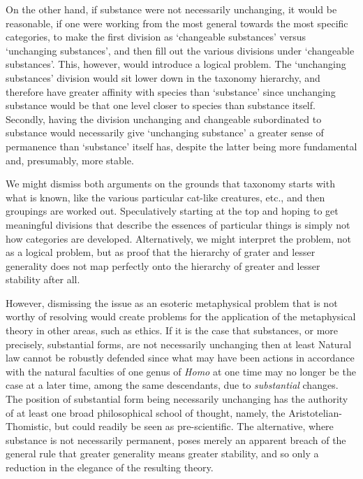 On the other hand, if substance were not necessarily unchanging, it would be reasonable, if one were working from the most general towards the most specific categories, to make the first division as `changeable substances' versus `unchanging substances', and then fill out the various divisions under `changeable substances'. This, however, would introduce a logical problem. The `unchanging substances' division would sit lower down in the taxonomy hierarchy, and therefore have greater affinity with species than `substance' since unchanging substance would be that one level closer to species than substance itself. Secondly, having the division unchanging and changeable subordinated to substance would necessarily give `unchanging substance' a greater sense of permanence than `substance' itself has, despite the latter being more fundamental and, presumably, more stable.

We might dismiss both arguments on the grounds that taxonomy starts with what is known, like the various particular cat-like creatures, etc., and then groupings are worked out. Speculatively starting at the top and hoping to get meaningful divisions that describe the essences of particular things is simply not how categories are developed. Alternatively, we might interpret the problem, not as a logical problem, but as proof that the hierarchy of grater and lesser generality does not map perfectly onto the hierarchy of greater and lesser stability after all.

However, dismissing the issue as an esoteric metaphysical problem that is not worthy of resolving would create problems for the application of the metaphysical theory in other areas, such as ethics. If it is the case that substances, or more precisely, substantial forms, are not necessarily unchanging then at least Natural law cannot be robustly defended since what may have been actions in accordance with the natural faculties of one genus of \emph{Homo} at one time may no longer be the case at a later time, among the same descendants, due to \emph{substantial} changes. The position of substantial form being necessarily unchanging has the authority of at least one broad philosophical school of thought, namely, the Aristotelian-Thomistic, but could readily be seen as pre-scientific. The alternative, where substance is not necessarily permanent, poses merely an apparent breach of the general rule that greater generality means greater stability, and so only a reduction in the elegance of the resulting theory.

